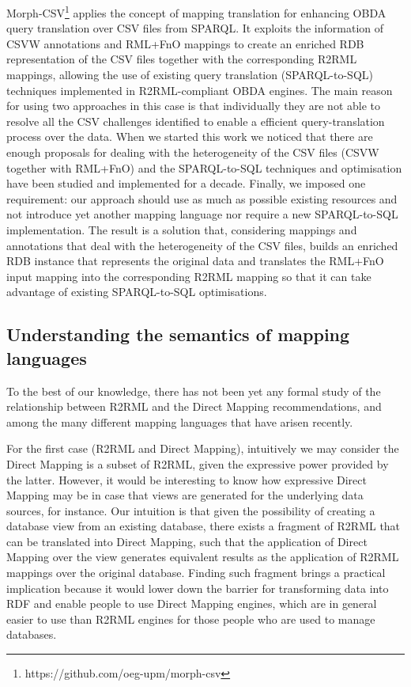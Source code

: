 Morph-CSV\footnote{https://github.com/oeg-upm/morph-csv} applies the concept of mapping translation for enhancing OBDA query translation over CSV files from SPARQL. It exploits the information of CSVW annotations and RML+FnO mappings to create an enriched RDB representation of the CSV files together with the corresponding R2RML mappings, allowing the use of existing query translation (SPARQL-to-SQL) techniques implemented in R2RML-compliant OBDA engines. The main reason for using two approaches in this case is that individually they are not able to resolve all the CSV challenges identified to enable a efficient query-translation process over the data. When we started this work we noticed that there are enough proposals for dealing with the heterogeneity of the CSV files (CSVW together with RML+FnO) and the SPARQL-to-SQL techniques and optimisation have been studied and implemented for a decade. Finally, we imposed one requirement: our approach should use as much as possible existing resources and not introduce yet another mapping language nor require a new SPARQL-to-SQL implementation. The result is a solution that, considering mappings and annotations that deal with the heterogeneity of the CSV files, builds an enriched RDB instance that represents the original data and translates the RML+FnO input mapping into the corresponding R2RML mapping so that it can take advantage of existing SPARQL-to-SQL optimisations.


\subsection{Understanding the semantics of mapping languages}
To the best of our knowledge, there has not been yet any formal study of the relationship between R2RML and the Direct Mapping recommendations, and among the many different mapping languages that have arisen recently.

For the first case (R2RML and Direct Mapping), intuitively we may consider the Direct Mapping is a subset of R2RML, given the expressive power provided by the latter. However, it would be interesting to know how expressive Direct Mapping may be in case that views are generated for the underlying data sources, for instance. Our intuition is that given the possibility of creating a database view from an existing database, there exists a fragment of R2RML that can be translated into Direct Mapping, such that the application of Direct Mapping over the view generates equivalent results as the application of R2RML mappings over the original database. Finding such fragment brings a practical implication because it would lower down the barrier for transforming data into RDF and enable people to use Direct Mapping engines, which are in general easier to use than R2RML engines for those people who are used to manage databases.

